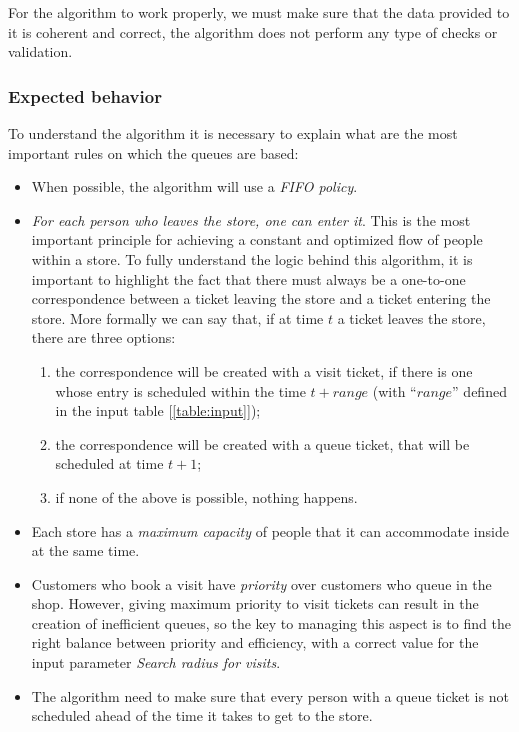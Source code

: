 \FloatBarrier

For the algorithm to work properly, we must make sure that the data provided to it is coherent and correct, the algorithm does not perform any type of checks or validation.

\subsubsection{Expected behavior}
\label{subsubsect:expectedbehavior}

To understand the algorithm it is necessary to explain what are the most important rules on which the queues are based:

\begin{itemize}[topsep=0pt]
    \item When possible, the algorithm will use a \textit{FIFO policy}.
    \item \textit{For each person who leaves the store, one can enter it}. This is the most important principle for achieving a constant and optimized flow of people within a store. To fully understand the logic behind this algorithm, it is important to highlight the fact that there must always be a one-to-one correspondence between a ticket leaving the store and a ticket entering the store.\newline
    More formally we can say that, if at time $t$ a ticket leaves the store, there are three options:
    \begin{enumerate}[topsep=0pt]
        \item the correspondence will be created with a visit ticket, if there is one whose entry is scheduled within the time $t + range$ (with “$range$” defined in the input table [\ref{table:input}]);
        \item the correspondence will be created with a queue ticket, that will be scheduled at time $t + 1$;
        \item if none of the above is possible, nothing happens.
    \end{enumerate}
    \item Each store has a \textit{maximum capacity} of people that it can accommodate inside at the same time.
    \item Customers who book a visit have \textit{priority} over customers who queue in the shop. However, giving maximum priority to visit tickets can result in the creation of inefficient queues, so the key to managing this aspect is to find the right balance between priority and efficiency, with a correct value for the input parameter \textit{Search radius for visits}.
    \item The algorithm need to make sure that every person with a queue ticket is not scheduled ahead of the time it takes to get to the store.
\end{itemize}

